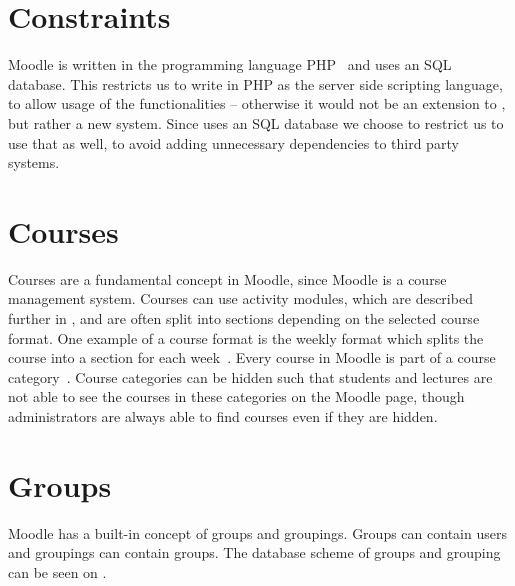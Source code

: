 \section{Constraints}
\label{sub:constraints}
Moodle is written in the programming language PHP~\cite{moodleabout} and uses an SQL database.
This restricts us to write \system{} in PHP as the server side scripting language, to allow usage of the \moodle{} functionalities -- otherwise it would not be an extension to \moodle{}, but rather a new system.
Since \moodle{} uses an SQL database we choose to restrict us to use that as well, to avoid adding unnecessary dependencies to third party systems.


\section{Courses}
\label{sub:courses}
Courses are a fundamental concept in Moodle, since Moodle is a course management system.
Courses can use activity modules, which are described further in , and are often split into sections depending on the selected course format.
One example of a course format is the weekly format which splits the course into a section for each week~\cite{moodlecourseformat}.
Every course in Moodle is part of a course category~\cite{moodlecoursecategories}. 
Course categories can be hidden such that students and lectures are not able to see the courses in these categories on the Moodle page, though administrators are always able to find courses even if they are hidden.


\section{Groups}
\label{sec:groups}
Moodle has a built-in concept of groups and groupings. 
Groups can contain users and groupings can contain groups. 
The database scheme of groups and grouping can be seen on .

